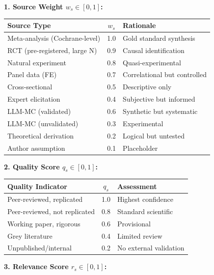 \documentclass[11pt,a4paper]{article}
\theoremstyle{definition}
\begin{document}
\begin{tcolorbox}[colback=blue!5!white, colframe=blue!75!black, 
    title=\textbf{Operational Scoring Guide for $E(\theta)$ Components}]

\textbf{1. Source Weight $w_s \in [0, 1]$:}

\begin{center}
\small
\begin{tabular}{@{}lcp{6cm}@{}}
\toprule
\textbf{Source Type} & $w_s$ & \textbf{Rationale} \\
\midrule
Meta-analysis (Cochrane-level) & 1.0 & Gold standard synthesis \\
RCT (pre-registered, large N) & 0.9 & Causal identification \\
Natural experiment & 0.8 & Quasi-experimental \\
Panel data (FE) & 0.7 & Correlational but controlled \\
Cross-sectional & 0.5 & Descriptive only \\
Expert elicitation & 0.4 & Subjective but informed \\
LLM-MC (validated) & 0.6 & Synthetic but systematic \\
LLM-MC (unvalidated) & 0.3 & Experimental \\
Theoretical derivation & 0.2 & Logical but untested \\
Author assumption & 0.1 & Placeholder \\
\bottomrule
\end{tabular}
\end{center}

\textbf{2. Quality Score $q_s \in [0, 1]$:}

\begin{center}
\small
\begin{tabular}{@{}lcp{6cm}@{}}
\toprule
\textbf{Quality Indicator} & $q_s$ & \textbf{Assessment} \\
\midrule
Peer-reviewed, replicated & 1.0 & Highest confidence \\
Peer-reviewed, not replicated & 0.8 & Standard scientific \\
Working paper, rigorous & 0.6 & Provisional \\
Grey literature & 0.4 & Limited review \\
Unpublished/internal & 0.2 & No external validation \\
\bottomrule
\end{tabular}
\end{center}

\textbf{3. Relevance Score $r_s \in [0, 1]$:}


\end{tcolorbox}
\end{document}
